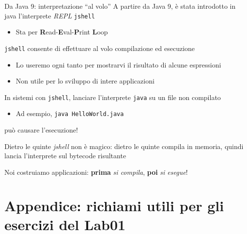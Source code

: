 \documentclass[xcolor=dvipsnames,presentation]{beamer}
\begin{document}
\begin{frame}{Da Java 9: interpretazione ``al volo''}
    A partire da Java 9, è stata introdotto in java l'interprete \textit{REPL} \texttt{jshell}
    \begin{itemize}
        \item Sta per \textbf{R}ead-\textbf{E}val-\textbf{P}rint \textbf{L}oop
    \end{itemize}
    \texttt{jshell} consente di effettuare al volo compilazione ed esecuzione
    \begin{itemize}
        \item Lo useremo ogni tanto per mostrarvi il risultato di alcune espressioni
        \item Non utile per lo sviluppo di intere applicazioni
    \end{itemize}
    In sistemi con \texttt{jshell}, lanciare l'interprete \texttt{java} su un file non compilato
    \begin{itemize}
        \item Ad esempio, \texttt{java HelloWorld.java}
    \end{itemize}
    può causare l'esecuzione!
    \begin{block}{Dietro le quinte}
        \textit{jshell} non è magico: dietro le quinte compila in memoria, quindi lancia l'interprete sul bytecode risultante
    \end{block}
    Noi costruiamo applicazioni: \textbf{prima} \textit{si compila}, \textbf{poi} \textit{si esegue}!
\end{frame}

\section{Appendice: richiami utili per gli esercizi del Lab01}

\end{document}
